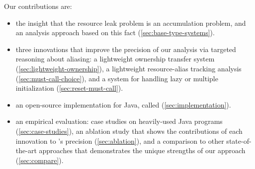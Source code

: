 Our contributions are:
\begin{itemize}
\item the insight that the resource leak problem is an accumulation
  problem, and
  an analysis approach based on
  this fact (\cref{sec:base-type-systems}).
\item three
  innovations that improve the precision of our analysis via targeted reasoning about aliasing:
  a lightweight ownership transfer system
  (\cref{sec:lightweight-ownership}), a lightweight resource-alias
  tracking analysis (\cref{sec:must-call-choice}), and a system for
  handling lazy or multiple initialization (\cref{sec:reset-must-call}).
\item an open-source implementation for Java,
  called \tool (\cref{sec:implementation}).
\item an empirical evaluation: case studies on heavily-used
  Java programs (\cref{sec:case-studies}),
  an ablation study that shows the contributions of each innovation to
  \tool's precision (\cref{sec:ablation}), and a comparison to
  other state-of-the-art approaches that demonstrates the unique strengths
  of our approach (\cref{sec:compare}).
\end{itemize}
  

